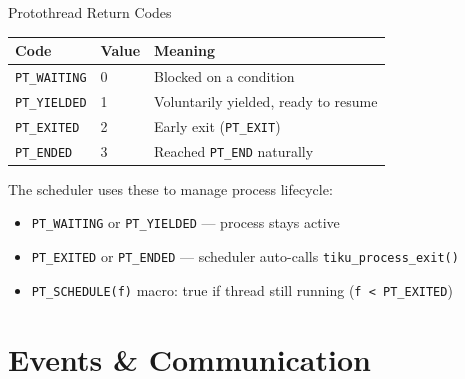 \documentclass[aspectratio=169, 10pt]{beamer}
\begin{document}
\begin{frame}[fragile]{Protothread Return Codes}
\begin{table}
\centering
\begin{tabular}{@{}llp{7cm}@{}}
\toprule
\textbf{Code} & \textbf{Value} & \textbf{Meaning} \\
\midrule
\texttt{PT\_WAITING} & 0 & Blocked on a condition \\
\texttt{PT\_YIELDED} & 1 & Voluntarily yielded, ready to resume \\
\texttt{PT\_EXITED}  & 2 & Early exit (\texttt{PT\_EXIT}) \\
\texttt{PT\_ENDED}   & 3 & Reached \texttt{PT\_END} naturally \\
\bottomrule
\end{tabular}
\end{table}

\vspace{0.5em}
The scheduler uses these to manage process lifecycle:
\begin{itemize}
  \item \texttt{PT\_WAITING} or \texttt{PT\_YIELDED} --- process stays active
  \item \texttt{PT\_EXITED} or \texttt{PT\_ENDED} --- scheduler auto-calls \texttt{tiku\_process\_exit()}
  \item \texttt{PT\_SCHEDULE(f)} macro: true if thread still running
        (\texttt{f < PT\_EXITED})
\end{itemize}
\end{frame}

\section{Events \& Communication}
\end{document}
